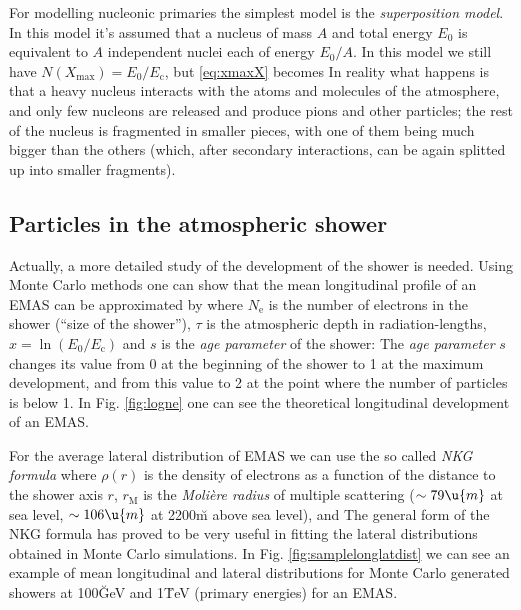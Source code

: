 For modelling nucleonic primaries the simplest model is the
\emph{superposition model}. In this model it's assumed that a nucleus
of mass $A$ and total energy $E_0$ is equivalent to $A$ independent
nuclei each of energy $E_0/A$. In this model we still have
$N(X_{\mathrm{max}}) = E_0 / E_{\mathrm{c}}$, but \eqref{eq:xmaxX}
becomes
%
\NXsimpleHadeq
%
In reality what happens is that a heavy nucleus interacts with the
atoms and molecules of the atmosphere, and only few nucleons are
released and produce pions and other particles; the rest of the
nucleus is fragmented in smaller pieces, with one of them being much
bigger than the others (which, after secondary interactions, can be
again splitted up into smaller fragments).

\lognefig

\subsection{Particles in the atmospheric shower}

Actually, a more detailed study of the development of the shower is
needed. Using Monte Carlo methods one can show that the mean
longitudinal profile of an EMAS can be approximated by
%
\Neeq
%
where $N_{\mathrm{e}}$ is the number of electrons in the shower
(``size of the shower''), $\tau$ is the atmospheric depth in
radiation-lengths, $x=\ln(E_0/E_{\mathrm{c}})$ and $s$ is the
\emph{age parameter} of the shower:
%
\ageeq
%
The \emph{age parameter} $s$ changes its value from 0 at the beginning
of the shower to 1 at the maximum development, and from this value to
2 at the point where the number of particles is below 1. In Fig.
\ref{fig:logne} one can see the theoretical longitudinal development
of an EMAS.

\samplelonglatdistfig

For the average lateral distribution of EMAS we can use the so called
\emph{NKG formula}
%
\NKGeq
%
where $\rho(r)$ is the density of electrons as a function of the
distance to the shower axis $r$, $r_{\mathrm{M}}$ is the
\emph{Moli\`ere radius} of multiple scattering ($\sim 79\u{m}$ at sea
level, $\sim 106\u{m}$ at 2200\u{m} above sea level), and
%
\fsreq
%
The general form of the NKG formula has proved to be very useful in
fitting the lateral distributions obtained in Monte Carlo
simulations. In Fig. \ref{fig:samplelonglatdist} we can see an example of
mean longitudinal and lateral distributions for Monte Carlo generated
showers at 100\u{GeV} and 1\u{TeV} (primary energies) for an EMAS.

